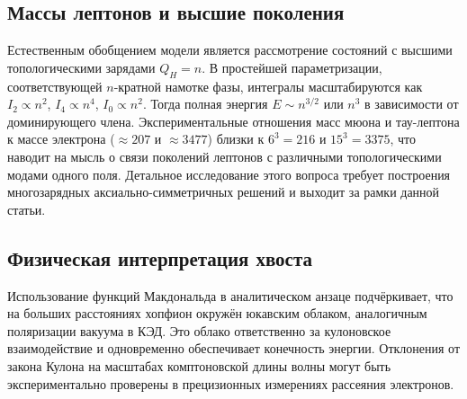 \documentclass[12pt]{article}
\begin{document}
\subsection{Массы лептонов и высшие поколения}
Естественным обобщением модели является рассмотрение состояний с высшими топологическими зарядами $Q_H = n$. В простейшей параметризации, соответствующей $n$-кратной намотке фазы, интегралы масштабируются как $I_2 \propto n^2$, $I_4 \propto n^4$, $I_0 \propto n^2$. Тогда полная энергия $E \sim n^{3/2}$ или $n^3$ в зависимости от доминирующего члена. Экспериментальные отношения масс мюона и тау-лептона к массе электрона ($\approx 207$ и $\approx 3477$) близки к $6^3=216$ и $15^3=3375$, что наводит на мысль о связи поколений лептонов с различными топологическими модами одного поля. Детальное исследование этого вопроса требует построения многозарядных аксиально-симметричных решений и выходит за рамки данной статьи.

\subsection{Физическая интерпретация хвоста}
Использование функций Макдональда в аналитическом анзаце подчёркивает, что на больших расстояниях хопфион окружён юкавским облаком, аналогичным поляризации вакуума в КЭД. Это облако ответственно за кулоновское взаимодействие и одновременно обеспечивает конечность энергии. Отклонения от закона Кулона на масштабах комптоновской длины волны могут быть экспериментально проверены в прецизионных измерениях рассеяния электронов.
\end{document}
